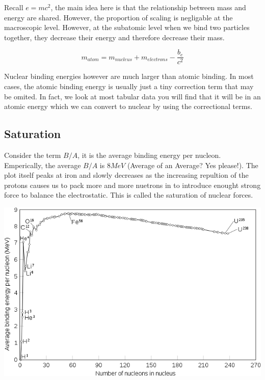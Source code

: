 \documentclass[english, 11pt]{article}
\begin{document}
      Recall $e=mc^2$, the main idea here is that the relationship between mass and energy are shared. However, the proportion of scaling is negligable at the macroscopic level. However, at the subatomic level when we bind two particles together, they decrease their energy and therefore decrease their mass. 

      \begin{exmp}
        \[  m_{atom} = m_{nucleus} + m_{electrons} - \frac{b_{e}}{c^2} \]
      \end{exmp}
      
      Nuclear binding energies however are much larger than atomic binding. In most cases, the atomic binding energy is usually just a tiny correction term that may be omited. In fact, we look at most tabular data you will find that it will be in an atomic energy which we can convert to nuclear by using the correctional terms.\\

      \subsection{Saturation}

      Consider the term $B/A$, it is the average binding energy per nucleon. Emperically, the average $B/A$ is $8 MeV$ (Average of an Average? Yes please!). The plot itself peaks at iron and slowly decreases as the increasing repultion of the protons causes us to pack more and more nuetrons in to introduce enought strong force to balance the electrostatic. This is called the saturation of nuclear forces. 

      \begin{center}\label{plot}
         \includegraphics[scale=0.5 ]{../img/ba}
      \end{center}
\end{document}
